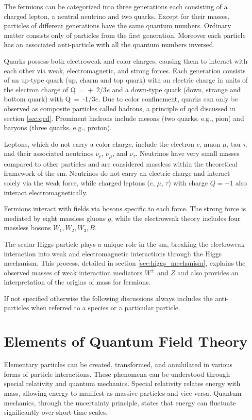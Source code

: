 The fermions can be categorized into three generations each consisting of a charged lepton, a neutral neutrino and two quarks. Except for their masses, particles of different generations have the same quantum numbers. Ordinary matter consists only of particles from the first generation. Moreover each particle has an associated anti-particle with all the quantum numbers inversed.

Quarks possess both electroweak and color charges, causing them to interact with each other via weak, electromagnetic, and strong forces. Each generation consists of an up-type quark (up, charm and top quark) with an electric charge in units of the electron charge of \mbox{Q = + 2/3$e$} and a down-type quark (down, strange and bottom quark) with \mbox{Q = -1/3$e$}. Due to color confinement, quarks can only be observed as composite particles called hadrons, a principle of \ac{qcd} discussed in section \ref{sec:qcd}. Prominent hadrons include mesons (two quarks, e.g., pion) and baryons (three quarks, e.g., proton).

Leptons, which do not carry a color charge, include the electron $e$, muon $\mu$, tau $\tau$, and their associated neutrinos $\nu_e$, $\nu_\mu$, and $\nu_\tau$. Neutrinos have very small masses compared to other particles and are considered massless within the theoretical framework of the \ac{sm}. Neutrinos do not carry an electric charge and interact solely via the weak force, while charged leptons ($e$, $\mu$, $\tau$) with charge $Q=-1$ also interact electromagnetically.

Fermions interact with fields via bosons specific to each force. The strong force is mediated by eight massless gluons $g$, while the electroweak theory includes four massless bosons $W_1,W_2,W_3,B$.

The scalar Higgs particle plays a unique role in the \ac{sm}, breaking the electroweak interaction into weak and electromagnetic interactions through the Higgs mechanism. This process, detailed in section \ref{sec:higgs_mechanism}, explains the observed masses of weak interaction mediators $W^{\pm}$ and $Z$ and also provides an interpretation of the origins of mass for fermions.

If not specified otherwise the following discussions always includes the anti-particles when referred to a species or a particular particle.

\section{Elements of Quantum Field Theory}\label{sec:qft}
Elementary particles can be created, transformed, and annihilated in various forms of particle interactions. These phenomena can be understood through special relativity and quantum mechanics. Special relativity relates energy with mass, allowing energy to manifest as massive particles and vice versa. Quantum mechanics, through the uncertainty principle, states that energy can fluctuate significantly over short time scales.

